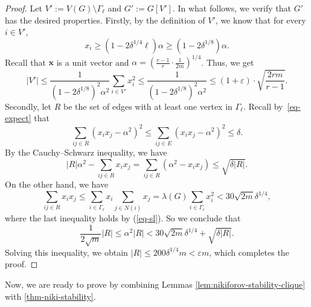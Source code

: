 \documentclass[11pt,a4paper]{article}
\theoremstyle{definition}
\theoremstyle{remark}
\newcommand*{\abs}[1]{\lvert#1\rvert}
\begin{document}
\begin{proof}
    Let $V':=V(G)\setminus \Gamma_{\ell}$ and  $G':=G[V']$. 
    In what follows, we verify that $G'$ has the desired properties. 
    Firstly, by the definition of $V'$, we know that for every $i \in V'$,  
    $$x_i \geq (1 - 2\delta^{1/4} \ell) \alpha \geq (1 - 2\delta^{1/8}) \alpha.$$
    Recall that $\bm{x}$ is a unit vector and 
    $\alpha = (\frac{r-1}{r}\cdot \frac{1}{2m})^{1/4}$. 
    Thus, we get 
    $$
    |V'|   \leq \frac{1}{(1 - 2\delta^{1/8})^2 \alpha^2} 
    \sum_{i\in V'} x_i^2 \leq \frac{1}{(1 - 2\delta^{1/8})^2 \alpha^2} \leq (1 + \varepsilon) \cdot \sqrt{\frac{2rm}{r - 1}}.
$$    
Secondly, let $R$ be the set of edges with at least one vertex in $\Gamma_{\ell}$. Recall by~\eqref{eq-expect} that
    $$\sum_{ij \in R} \left(x_i x_j - \alpha^2\right)^2 \leq \sum_{ij \in E} \left(x_i x_j - \alpha^2\right)^2 \leq \delta.$$
    By the Cauchy--Schwarz inequality, we have
    $$ |R| \alpha^2 - \sum_{ij\in R} x_ix_j = 
    \sum_{ij \in R} (\alpha^2 - x_i x_j) \leq \sqrt{\delta \abs{R}}.$$
    On the other hand, we have
    $$\sum_{ij \in R} x_i x_j \leq \sum_{i\in \Gamma_{\ell}} x_i \sum_{j\in N(i)} x_j = 
    \lambda(G) \sum_{i \in \Gamma_{\ell}} x_i^2 < 30 \sqrt{2m} \delta^{1/4},$$
    where the last inequality holds by (\ref{eq-sl}). 
    So we conclude that
    $$\frac{1}{2\sqrt{m}}\abs{R} \leq \alpha^2 \abs{R} < 30 \sqrt{2m} \delta^{1/4} + \sqrt{\delta \abs{R}}.$$
    Solving this inequality, we obtain  $\abs{R} \leq 200\delta^{1/4} m < \varepsilon m$, which completes the proof.
\end{proof}

Now, we are ready to prove  
by combining Lemmas \ref{lem:nikiforov-stability-clique} with \ref{thm-niki-stability}. 
\end{document}
